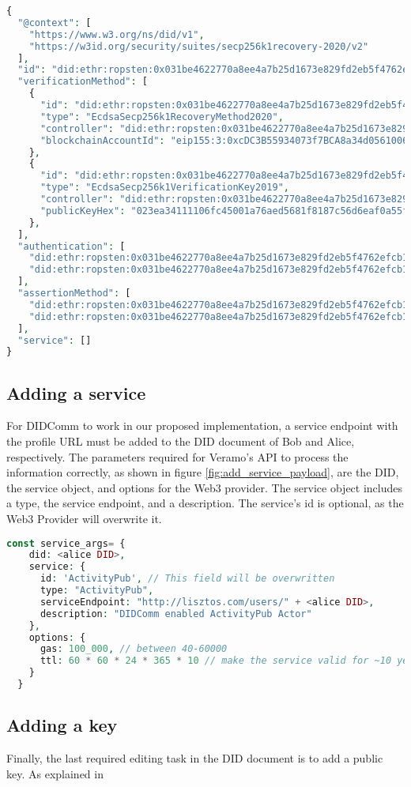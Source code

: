 \lstset{style=JSONStyle}
\begin{lstlisting}[language=PHP, caption=Initial DID document for Alice, label=fig:default_did_document_ethr, float=h]
  {
  "@context": [
    "https://www.w3.org/ns/did/v1",
    "https://w3id.org/security/suites/secp256k1recovery-2020/v2"
  ],
  "id": "did:ethr:ropsten:0x031be4622770a8ee4a7b25d1673e829fd2eb5f4762efcb18d09d468e6a00cc6c4d",
  "verificationMethod": [
    {
      "id": "did:ethr:ropsten:0x031be4622770a8ee4a7b25d1673e829fd2eb5f4762efcb18d09d468e6a00cc6c4d#controller",
      "type": "EcdsaSecp256k1RecoveryMethod2020",
      "controller": "did:ethr:ropsten:0x031be4622770a8ee4a7b25d1673e829fd2eb5f4762efcb18d09d468e6a00cc6c4d",
      "blockchainAccountId": "eip155:3:0xcDC3B55934073f7BCA8a34d0561006CC1f26E9Fa"
    },
    {
      "id": "did:ethr:ropsten:0x031be4622770a8ee4a7b25d1673e829fd2eb5f4762efcb18d09d468e6a00cc6c4d#controllerKey",
      "type": "EcdsaSecp256k1VerificationKey2019",
      "controller": "did:ethr:ropsten:0x031be4622770a8ee4a7b25d1673e829fd2eb5f4762efcb18d09d468e6a00cc6c4d",
      "publicKeyHex": "023ea34111106fc45001a76aed5681f8187c56d6eaf0a55fc9af92d11c2732c2c8"
    },
  ],
  "authentication": [
    "did:ethr:ropsten:0x031be4622770a8ee4a7b25d1673e829fd2eb5f4762efcb18d09d468e6a00cc6c4d#controller",
    "did:ethr:ropsten:0x031be4622770a8ee4a7b25d1673e829fd2eb5f4762efcb18d09d468e6a00cc6c4d#controllerKey"
  ],
  "assertionMethod": [
    "did:ethr:ropsten:0x031be4622770a8ee4a7b25d1673e829fd2eb5f4762efcb18d09d468e6a00cc6c4d#controller",
    "did:ethr:ropsten:0x031be4622770a8ee4a7b25d1673e829fd2eb5f4762efcb18d09d468e6a00cc6c4d#controllerKey",
  ],
  "service": []
}
\end{lstlisting}

\subsection{Adding a service}

For DIDComm to work in our proposed implementation, a service endpoint with the profile URL must be added to the DID document of Bob and Alice, respectively. The parameters required for Veramo's API to process the information correctly, as shown in figure \ref{fig:add_service_payload}, are the DID, the service object, and options for the Web3 provider. The service object includes a type, the service endpoint, and a description. The service's id is optional, as the Web3 Provider will overwrite it. 


\lstset{style=JSONStyle}
\begin{lstlisting}[language=PHP, caption=Parameters to add a service in Veramo, label=fig:add_service_payload, float=h]
  const service_args= {
    did: <alice DID>,
    service: {
      id: 'ActivityPub', // This field will be overwritten
      type: "ActivityPub",
      serviceEndpoint: "http://lisztos.com/users/" + <alice DID>,
      description: "DIDComm enabled ActivityPub Actor"
    },
    options: {
      gas: 100_000, // between 40-60000
      ttl: 60 * 60 * 24 * 365 * 10 // make the service valid for ~10 years
    }
  }
\end{lstlisting}


\subsection{Adding a key}
Finally, the last required editing task in the DID document is to add a public key. As explained in 
